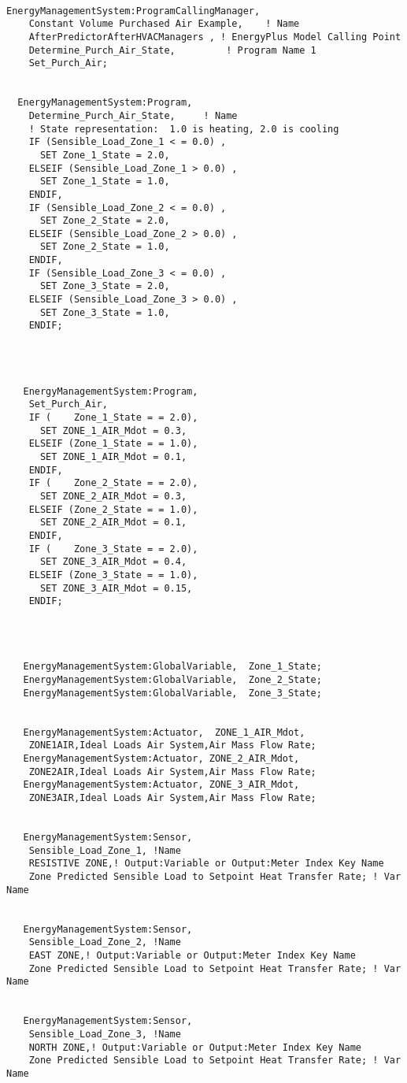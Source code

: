 \begin{lstlisting}

EnergyManagementSystem:ProgramCallingManager,
    Constant Volume Purchased Air Example,    ! Name
    AfterPredictorAfterHVACManagers , ! EnergyPlus Model Calling Point
    Determine_Purch_Air_State,         ! Program Name 1
    Set_Purch_Air;


  EnergyManagementSystem:Program,
    Determine_Purch_Air_State,     ! Name
    ! State representation:  1.0 is heating, 2.0 is cooling
    IF (Sensible_Load_Zone_1 < = 0.0) ,
      SET Zone_1_State = 2.0,
    ELSEIF (Sensible_Load_Zone_1 > 0.0) ,
      SET Zone_1_State = 1.0,
    ENDIF,
    IF (Sensible_Load_Zone_2 < = 0.0) ,
      SET Zone_2_State = 2.0,
    ELSEIF (Sensible_Load_Zone_2 > 0.0) ,
      SET Zone_2_State = 1.0,
    ENDIF,
    IF (Sensible_Load_Zone_3 < = 0.0) ,
      SET Zone_3_State = 2.0,
    ELSEIF (Sensible_Load_Zone_3 > 0.0) ,
      SET Zone_3_State = 1.0,
    ENDIF;




   EnergyManagementSystem:Program,
    Set_Purch_Air,
    IF (    Zone_1_State = = 2.0),
      SET ZONE_1_AIR_Mdot = 0.3,
    ELSEIF (Zone_1_State = = 1.0),
      SET ZONE_1_AIR_Mdot = 0.1,
    ENDIF,
    IF (    Zone_2_State = = 2.0),
      SET ZONE_2_AIR_Mdot = 0.3,
    ELSEIF (Zone_2_State = = 1.0),
      SET ZONE_2_AIR_Mdot = 0.1,
    ENDIF,
    IF (    Zone_3_State = = 2.0),
      SET ZONE_3_AIR_Mdot = 0.4,
    ELSEIF (Zone_3_State = = 1.0),
      SET ZONE_3_AIR_Mdot = 0.15,
    ENDIF;




   EnergyManagementSystem:GlobalVariable,  Zone_1_State;
   EnergyManagementSystem:GlobalVariable,  Zone_2_State;
   EnergyManagementSystem:GlobalVariable,  Zone_3_State;


   EnergyManagementSystem:Actuator,  ZONE_1_AIR_Mdot,
    ZONE1AIR,Ideal Loads Air System,Air Mass Flow Rate;
   EnergyManagementSystem:Actuator, ZONE_2_AIR_Mdot,
    ZONE2AIR,Ideal Loads Air System,Air Mass Flow Rate;
   EnergyManagementSystem:Actuator, ZONE_3_AIR_Mdot,
    ZONE3AIR,Ideal Loads Air System,Air Mass Flow Rate;


   EnergyManagementSystem:Sensor,
    Sensible_Load_Zone_1, !Name
    RESISTIVE ZONE,! Output:Variable or Output:Meter Index Key Name
    Zone Predicted Sensible Load to Setpoint Heat Transfer Rate; ! Var Name


   EnergyManagementSystem:Sensor,
    Sensible_Load_Zone_2, !Name
    EAST ZONE,! Output:Variable or Output:Meter Index Key Name
    Zone Predicted Sensible Load to Setpoint Heat Transfer Rate; ! Var Name


   EnergyManagementSystem:Sensor,
    Sensible_Load_Zone_3, !Name
    NORTH ZONE,! Output:Variable or Output:Meter Index Key Name
    Zone Predicted Sensible Load to Setpoint Heat Transfer Rate; ! Var Name
\end{lstlisting}
